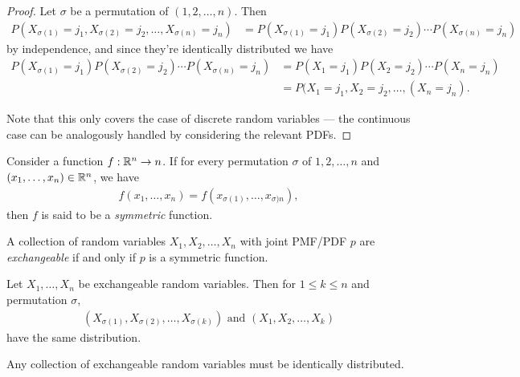 \begin{proof}
    Let $\sigma$ be a permutation of $(1, 2, \ldots, n)$. Then
    \begin{align*}
        P(X_{\sigma(1)} = j_1, X_{\sigma(2)} = j_2, \ldots, X_{\sigma(n)} = j_n) &= P(X_{\sigma(1)} = j_1)P(X_{\sigma(2)} = j_2)\cdots P(X_{\sigma(n)} = j_n)
    \end{align*}
    by independence, and since they're identically distributed we have
    \begin{align*}
        P(X_{\sigma(1)} = j_1)P(X_{\sigma(2)} = j_2)\cdots P(X_{\sigma(n)} = j_n) &= P(X_{1} = j_1)P(X_{2} = j_2)\cdots P(X_{n} = j_n) \\
        &= P(X_{1} = j_1, X_{2} = j_2, \ldots, (X_{n} = j_n).
    \end{align*}

    Note that this only covers the case of discrete random variables --- the continuous case can be analogously handled by considering the relevant PDFs.
\end{proof}

\begin{defn}
    Consider a function $f: \mathbb{R}^n \to n$. If for every permutation $\sigma$ of $1, 2, \ldots, n$ and $(x_1, \ldots, x_n) \in \mathbb{R}^n$, we have
    \begin{align*}
        f(x_1, \ldots, x_n) = f(x_{\sigma(1)}, \ldots, x_{\sigma)n}),
    \end{align*}
    then $f$ is said to be a \emph{symmetric} function.
\end{defn}

\begin{prop}
    A collection of random variables $X_1, X_2, \ldots, X_n$ with joint PMF/PDF $p$ are \emph{exchangeable} if and only if $p$ is a symmetric function.
\end{prop}

\begin{prop}\label{exchangeability-subset}
    Let $X_1, \ldots, X_n$ be exchangeable random variables. Then for $1 \leq k \leq n$ and permutation $\sigma$,
    \begin{align*}
        (X_{\sigma(1)}, X_{\sigma(2)}, \ldots, X_{\sigma(k)})\textrm{ and } (X_1, X_2, \ldots, X_k)
    \end{align*}
    have the same distribution.
\end{prop}

\begin{cor}
    Any collection of exchangeable random variables must be identically distributed.
\end{cor}

